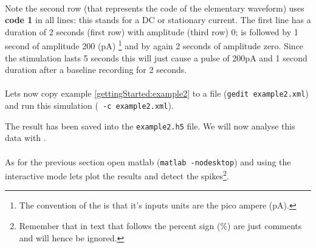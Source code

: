 \paragraph{}
Note the second row (that represents the code of the elementary
waveform) uses \textbf{code 1} in all lines: this stands for a DC or
stationary current.
The first line has a duration of 2 seconds (first row) with amplitude
(third row) 0; is followed by 1 second of amplitude 200 (pA)
\footnote{The convention of the  is that
  it's inputs units are the pico ampere (pA).} and by again 2 seconds
of amplitude zero. Since the stimulation lasts 5 seconds this will
just cause a pulse of 200pA and 1 second duration after a baseline
recording for 2 seconds. 
 
\paragraph{}
Lets now copy example \ref{gettingStarted:example2} to a file
(\texttt{gedit example2.xml}) and run this simulation
(\texttt{\progname\ -c example2.xml}).

The result has been saved into the \texttt{example2.h5} file. We will
now analyse this data with \matlab.
 
\paragraph{}
As for the previous section open matlab (\texttt{matlab -nodesktop})
and using the interactive mode lets plot the results and detect the
spikes\footnote{Remember that in \matlab text that follows the percent
  sign (\%) are just comments and will hence be ignored.}.
 
